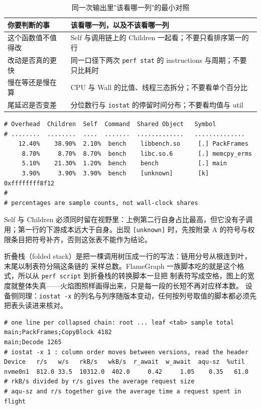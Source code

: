 \documentclass[12pt,a4paper,fontset=fandol]{ctexbook}
\newcommand{\Tp}[1]{\texttt{#1}}
\newcommand{\Lang}[1]{\textsf{#1}}
\newcommand{\MWall}{\Lang{Wall}}
\newcommand{\MCpu}{\Lang{CPU}}
\newcommand{\Mx}[1]{\textsf{#1}}
\begin{document}
\begin{table}[htbp]
\centering
\small
\begin{tabular}{>{\raggedright\arraybackslash}p{} >{\raggedright\arraybackslash}p{}}
\toprule
你要判断的事 & 该看哪一列，以及不该看哪一列 \\
\midrule
这个函数值不值得改 & Self 与调用链上的 Children 一起看；不要只看排序第一的行 \\
改动是否真的更快 & 同一口径下两次 \Tp{perf stat} 的 \Mx{instructions} 与周期；不要只比耗时 \\
慢在等还是慢在算 & \MCpu{} 与 \MWall{} 的比值、线程三态拆分；不要看单个百分比 \\
尾延迟是否变差 & 分位数行与 \Tp{iostat} 的停留时间分布；不要看均值与 \Mx{util} \\
\bottomrule
\end{tabular}
\caption{同一次输出里"该看哪一列"的最小对照}
\label{tab:pmapB-column-choice}
\end{table}

\begin{lstlisting}[style=outstyle,caption={形态示意：\Tp{perf report --stdio} 的列头与行形状（非本仓库实测值）},label={lst:pmapB-report}]
# Overhead  Children  Self  Command  Shared Object   Symbol
# ........  ........  ....  .......  .............   ..............
    12.40%    38.90%  2.10%  bench    libbench.so     [.] PackFrames
     8.70%     8.70%  8.70%  bench    libc.so.6       [.] memcpy_erms
     5.10%    21.30%  1.20%  bench    bench           [.] main
     3.90%     3.90%  3.90%  bench    [unknown]       [k] 0xffffffff8f12
#
# percentages are sample counts, not wall-clock shares
\end{lstlisting}

Self 与 Children 必须同时留在视野里：上例第二行自身占比最高，但它没有子调用；第一行的下游成本远大于自身。出现 \Tp{[unknown]} 时，先按附录 A 的符号与权限条目把符号补齐，否则这张表不能作为结论。

折叠栈（folded stack）是把一棵调用树压成一行的写法：链用分号从根连到叶，末尾以制表符分隔这条链的
采样总数。FlameGraph 一族脚本吃的就是这个格式，所以从 \Tp{perf script} 到折叠栈的转换脚本一旦把
制表符写成空格，图上的宽度就整体失真——火焰图照样画得出来，只是每一段的长短不再对应样本数。
设备侧同理：\Tp{iostat -x} 的列名与列序随版本变动，任何按列号取值的脚本都必须先把表头读进来核对。

\begin{lstlisting}[style=outstyle,caption={形态示意：折叠栈的一行与 \Tp{iostat -x} 的字段排布（非实测值）},label={lst:pmapB-folded}]
# one line per collapsed chain: root ... leaf <tab> sample total
main;PackFrames;CopyBlock 4182
main;Decode 1265
# iostat -x 1 : column order moves between versions, read the header
Device   r/s   w/s   rkB/s   wkB/s  r_await  w_await  aqu-sz  %util
nvme0n1  812.0 33.5  10312.0  402.0     0.42     1.05    0.35   61.0
# rkB/s divided by r/s gives the average request size
# aqu-sz and r/s together give the average time a request spent in flight
\end{lstlisting}
\end{document}
